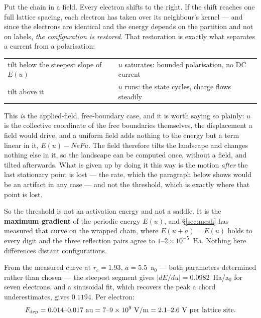 \documentclass[11pt]{article}
\begin{document}
Put the chain in a field. Every electron shifts to the right. If the shift reaches one full lattice
spacing, each electron has taken over its neighbour's kernel --- and since the electrons are
identical and the energy depends on the partition and not on labels, \emph{the configuration is
restored}. That restoration is exactly what separates a current from a polarisation:
\begin{center}
\small
\begin{tabular}{@{}ll@{}}
\toprule
tilt below the steepest slope of $E(u)$ & $u$ saturates: bounded polarisation, no DC current\\
tilt above it & $u$ runs: the state cycles, charge flows steadily\\
\bottomrule
\end{tabular}
\end{center}

\noindent This \emph{is} the applied-field, free-boundary case, and it is worth saying so plainly:
$u$ is the collective coordinate of the free boundaries themselves, the displacement a field would
drive, and a uniform field adds nothing to the energy but a term linear in it, $E(u)-NeFu$. The
field therefore tilts the landscape and changes nothing else in it, so the landscape can be computed
once, without a field, and tilted afterwards. What is given up by doing it this way is the motion
\emph{after} the last stationary point is lost --- the rate, which the paragraph below shows would
be an artifact in any case --- and not the threshold, which is exactly where that point is lost.

So the threshold is not an activation energy and not a saddle. It is the \textbf{maximum
gradient} of the periodic energy $E(u)$, and \S\ref{sec:mesh} has measured that curve on the wrapped
chain, where $E(u{+}a)=E(u)$ holds to every digit and the three reflection pairs agree to
$1$--$2\times10^{-5}$~Ha. Nothing here differences distant configurations.

From the measured curve at $r_c=1.93$, $a=5.5$~a$_0$ --- both parameters determined rather than
chosen --- the steepest segment gives $|dE/du|=0.0982$~Ha/a$_0$ for seven electrons, and a
sinusoidal fit, which recovers the peak a chord underestimates, gives $0.1194$. Per electron:
\begin{equation}\label{eq:Fdep}
F_{\rm dep}=0.014\text{--}0.017~\text{au}
 =7\text{--}9\times10^{9}~\mathrm{V/m}
 =2.1\text{--}2.6~\mathrm{V\ per\ lattice\ site}.
\end{equation}
\end{document}
